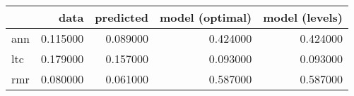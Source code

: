 \begin{tabular}{lrrrr}
\toprule
 & data & predicted & model (optimal) & model (levels) \\
\midrule
ann & 0.115000 & 0.089000 & 0.424000 & 0.424000 \\
ltc & 0.179000 & 0.157000 & 0.093000 & 0.093000 \\
rmr & 0.080000 & 0.061000 & 0.587000 & 0.587000 \\
\bottomrule
\end{tabular}
